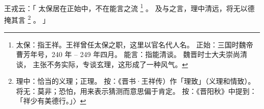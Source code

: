 
\switchcolumn*[\section{}]

王戎云：「
    太保居在正始中，不在能言之流%
    \footnote{%
        太保：指王祥。王祥曾任太保之职，这里以官名代人名。
        正始：三国时魏帝曹芳年号，240 年 -- 249 年四月。
        能言：指能清谈。
              魏晋时士大夫崇尚清谈，
              主张不务实际，专谈玄理，这形成了一种风气。
    }%
    。
    及与之言，理中清远，将无以德掩其言%
    \footnote{%
        理中：恰当的义理；正理。
        按：《晋书·王祥传）作「理致」（义理和情致）。
        将无：莫非；恐怕，用来表示猜测而意思偏于肯定。
        按：《晋阳秋》中提到：「祥少有美德行。」〉
    }%
    。
」

\switchcolumn


